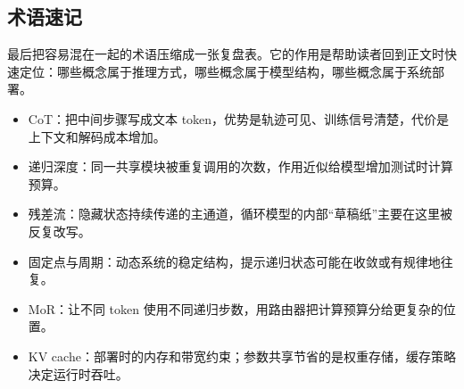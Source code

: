﻿\documentclass[a4paper]{article}
\begin{document}
\subsection{术语速记}

最后把容易混在一起的术语压缩成一张复盘表。它的作用是帮助读者回到正文时快速定位：哪些概念属于推理方式，哪些概念属于模型结构，哪些概念属于系统部署。

\begin{itemize}
  \item CoT：把中间步骤写成文本 token，优势是轨迹可见、训练信号清楚，代价是上下文和解码成本增加。
  \item 递归深度：同一共享模块被重复调用的次数，作用近似给模型增加测试时计算预算。
  \item 残差流：隐藏状态持续传递的主通道，循环模型的内部“草稿纸”主要在这里被反复改写。
  \item 固定点与周期：动态系统的稳定结构，提示递归状态可能在收敛或有规律地往复。
  \item MoR：让不同 token 使用不同递归步数，用路由器把计算预算分给更复杂的位置。
  \item KV cache：部署时的内存和带宽约束；参数共享节省的是权重存储，缓存策略决定运行时吞吐。
\end{itemize}

\end{document}
